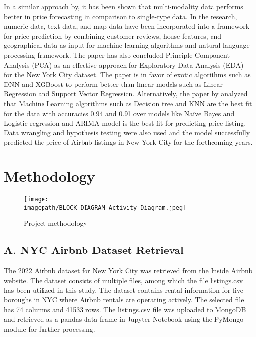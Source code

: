 \documentclass[conference]{IEEEtran}
\newcommand{\imagepath}{C:/Users/Lenovo/Desktop/SEM 6/BIG DATA/BIG_DATA_COURSEWORK/Images for Latex/}
\begin{document}
In a similar approach by, it has been shown that multi-modality data performs better in price forecasting in comparison to single-type data. In the research, numeric data, text data, and map data have been incorporated into a framework for price prediction by combining customer reviews, house features, and geographical data as input for machine learning algorithms and natural language processing framework. The paper has also concluded Principle Component Analysis (PCA) as an effective approach for Exploratory Data Analysis (EDA) for the New York City dataset. The paper is in favor of exotic algorithms such as DNN and XGBoost to perform better than linear models such as Linear Regression and Support Vector Regression. Alternatively, the paper by analyzed that Machine Learning algorithms such as Decision tree and KNN are the best fit for the data with accuracies 0.94 and 0.91 over models like Naïve Bayes and Logistic regression and ARIMA model is the best fit for predicting price listing. Data wrangling and hypothesis testing were also used and the model successfully predicted the price of Airbnb listings in New York City for the forthcoming years. \newline



\section{Methodology}
  

\begin{figure}[H]
  \centering
  \texttt{[image: \\imagepath/BLOCK\_DIAGRAM\_Activity\_Diagram.jpeg]}
  \caption{Project methodology}
  \label{fig:your_label}
\end{figure}


\subsection*{\centering A. NYC Airbnb Dataset Retrieval}
The 2022 Airbnb dataset for New York City was retrieved from the Inside Airbnb website. The dataset consists of multiple files, among which the file listings.csv has been utilized in this study. The dataset contains rental information for five boroughs in NYC where Airbnb rentals are operating actively. The selected file has 74 columns and 41533 rows. The listings.csv file was uploaded to MongoDB and retrieved as a pandas data frame in Jupyter Notebook using the PyMongo module for further processing.
\end{document}
